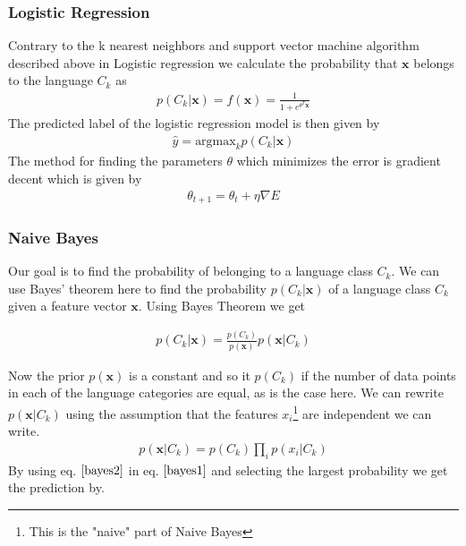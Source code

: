 \subsubsection{Logistic Regression}
Contrary to the k nearest neighbors and support vector machine algorithm described above in Logistic regression we calculate the probability that $\mathbf{x}$ belongs to the language $C_k$ as
\begin{align}
p(C_k|\mathbf{x}) = f(\mathbf{x}) = \frac{1}{1+e^{\theta^T \mathbf{x}}}
\end{align}
The predicted label of the logistic regression model is then given by
\begin{align}
  \hat{y} = \text{argmax}_k p(C_k|\mathbf{x})
\end{align}
The method for finding the parameters $\theta$ which minimizes the error is gradient decent which is given by
\begin{align}
  \theta_{t+1} = \theta_t + \eta \nabla E
\end{align}

\subsubsection{Naive Bayes}
%

Our goal is to find the probability of belonging to a language class $C_k$. We can use Bayes' theorem here to find the probability $p(C_k|\mathbf{x})$ of a language class $C_k$ given a feature vector $\mathbf{x}$. Using Bayes Theorem we get

\begin{align}
p(C_k|\mathbf{x}) = \frac{p(C_k)}{p(\mathbf{x})} p(\mathbf{x}|C_k)
\label{bayes1}
\end{align}

Now the prior $p(\mathbf{x})$ is a constant and so it $p(C_k)$ if the number of data points in each of the language categories are equal, as is the case here. We can rewrite $p(\mathbf{x}|C_k)$ using the assumption that the features $x_i$\footnote{This is the "naive" part of Naive Bayes} are independent we can write.
\begin{align}
p(\mathbf{x}|C_k) = p(C_k) \prod_i p(x_i|C_k)
\label{bayes2}
\end{align}
By using eq. $\ref{bayes2}$ in eq. $\ref{bayes1}$ and selecting the largest probability we get the prediction by.

